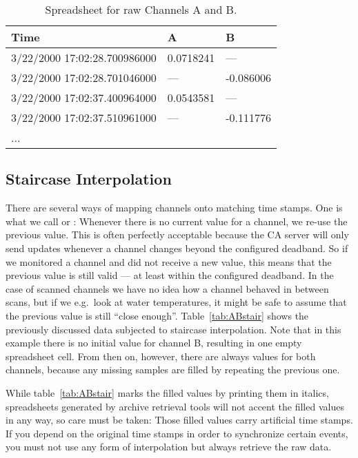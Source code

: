 \begin{table}[htbp]
  \begin{center}
    \begin{tabular}[t]{l|l|l}
      Time                         & A         & B         \\
      \hline
      3/22/2000 17:02:28.700986000 & 0.0718241 & ---       \\
      3/22/2000 17:02:28.701046000 & ---       & -0.086006 \\
      3/22/2000 17:02:37.400964000 & 0.0543581 & ---       \\
      3/22/2000 17:02:37.510961000 & ---       & -0.111776 \\
      ...
    \end{tabular}
    \caption{Spreadsheet for raw Channels A and B.}
    \label{tab:ABraw}
  \end{center}
\end{table}

\subsection{Staircase Interpolation}
There are several ways of mapping channels onto matching time
stamps. One is what we call  or
: Whenever there is no current value for a channel, we
re-use the previous value. This is often perfectly acceptable because
the CA server will only send updates whenever a channel changes
beyond the configured deadband. So if we monitored a channel and did
not receive a new value, this means that the previous value is still
valid --- at least within the configured deadband. In the case of
scanned channels we have no idea how a channel behaved in between
scans, but if we e.g.\ look at water temperatures, it might be safe to
assume that the previous value is still ``close enough''.
Table~\ref{tab:ABstair} shows the previously discussed data subjected
to staircase interpolation. Note that in this example there is no
initial value for channel B, resulting in one empty spreadsheet
cell. From then on, however, there are always values for both
channels, because any missing samples are filled by repeating the
previous one.

\NOTE While table~\ref{tab:ABstair} marks the filled values by
printing them in italics, spreadsheets generated by archive retrieval
tools will not accent the filled values in any way, so care must be
taken: Those filled values carry artificial time stamps. If you depend
on the original time stamps in order to synchronize certain events,
you must not use any form of interpolation but always retrieve the raw
data. 

